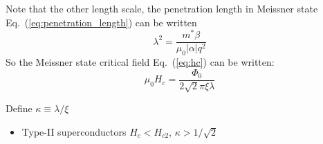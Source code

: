 \documentclass[11pt,letterpaper]{article}
\numberwithin{equation}{section} %
\begin{document}
Note that the other length scale, the penetration length in Meissner state
Eq.~(\ref{eq:penetration_length}) can be written 
\begin{equation}
	\lambda^2 = \frac{m^*\beta}{\mu_0|\alpha| q^2}
\end{equation}
So the Meissner state critical field Eq.~(\ref{eq:hc}) can be written: 
\begin{equation}
	\mu_0 H_c = \frac{\Phi_0}{2\sqrt{2}\pi\xi\lambda}
\end{equation}

Define $\kappa \equiv \lambda/\xi$
\begin{itemize}
	\item Type-II superconductors $H_c < H_{c2}$, $\kappa > 1/\sqrt 2$
\begin{center}
\end{center}
\end{itemize}
\end{document}
